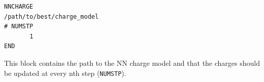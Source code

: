 \begin{lstlisting}[breaklines=true, breakatwhitespace=false]
NNCHARGE
/path/to/best/charge_model
# NUMSTP
       1
END
\end{lstlisting}
This block contains the path to the NN charge model and that the charges should be updated at every nth step (\texttt{NUMSTP}). 

